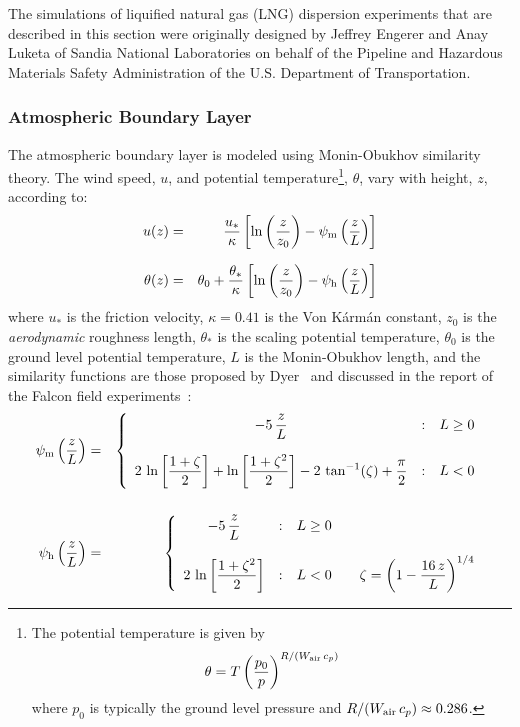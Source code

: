 The simulations of liquified natural gas (LNG) dispersion experiments that are described in this section were originally designed by Jeffrey Engerer and Anay Luketa of Sandia National Laboratories on behalf of the Pipeline and Hazardous Materials Safety Administration of the U.S. Department of Transportation.

\subsubsection{Atmospheric Boundary Layer}

The atmospheric boundary layer is modeled using Monin-Obukhov similarity theory. The wind speed, $u$, and potential temperature\footnote{The potential temperature is given by $$\theta=T \left( \frac{p_0}{p} \right)^{R/(W_{\rm air} \, c_p)}$$ where $p_0$ is typically the ground level pressure and $R/(W_{\rm air} \, c_p) \approx 0.286$.}, $\theta$, vary with height, $z$, according to:
\begin{eqnarray}
   u(z)      &=&            \frac{u_*}{\kappa}     \left[ \ln \left( \frac{z}{z_0} \right) - \psi_{\rm m} \left( \frac{z}{L} \right) \right] \label{u_om} \\[.1in]
   \theta(z) &=& \theta_0 + \frac{\theta_*}{\kappa} \left[ \ln \left( \frac{z}{z_0} \right) - \psi_{\rm h} \left( \frac{z}{L} \right) \right]
\end{eqnarray}
where $u_*$ is the friction velocity, $\kappa=0.41$ is the Von K\'{a}rm\'{a}n constant, $z_0$ is the \emph{aerodynamic} roughness length, $\theta_*$ is the scaling potential temperature, $\theta_0$ is the ground level potential temperature, $L$ is the Monin-Obukhov length, and the similarity functions are those proposed by Dyer~\cite{Dyer:1974} and discussed in the report of the Falcon field experiments~\cite{Falcon}:
\begin{eqnarray}
   \psi_{\rm m}\left(\frac{z}{L}\right) &=& \left\{ \begin{array}{c@{\quad:\quad}l} \displaystyle -5 \, \frac{z}{L} & L \ge 0 \\[.2in]  \displaystyle 2 \, \ln \left[\frac{1+\zeta}{2}\right] + \ln \left[\frac{1+\zeta^2}{2}\right]-2 \, \tan^{-1}(\zeta) + \frac{\pi}{2} & L<0 \end{array} \right.  \\[.2in]
   \psi_{\rm h}\left(\frac{z}{L}\right) &=& \left\{ \begin{array}{c@{\quad:\quad}l} \displaystyle -5 \, \frac{z}{L} & L \ge 0 \\[.2in]  \displaystyle 2 \, \ln \left[\frac{1+\zeta^2}{2}\right] & L<0 \quad \quad  \displaystyle \zeta=\left( 1 - \frac{16 \, z}{L} \right)^{1/4}  \end{array} \right.
\end{eqnarray}
